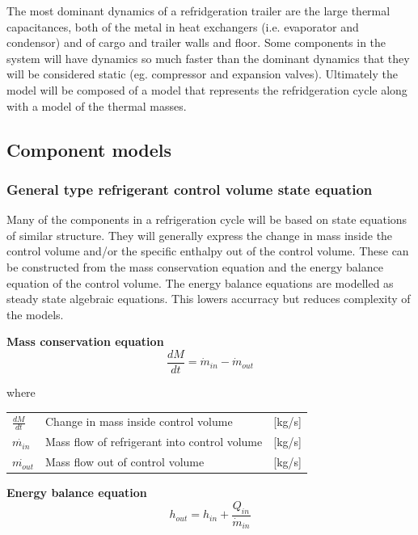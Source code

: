 The most dominant dynamics of a refridgeration trailer are the large thermal capacitances, both of the metal in heat exchangers (i.e. evaporator and condensor) and of cargo and trailer walls and floor. Some components in the system will have dynamics so much faster than the dominant dynamics that they will be considered static (eg. compressor and expansion valves).
Ultimately the model will be composed of a model that represents the refridgeration cycle along with a model of the thermal masses.


\subsection{Component models}

\subsubsection{General type refrigerant control volume state equation}
Many of the components in a refrigeration cycle will be based on state equations of similar structure. They will generally express the change in mass inside the control volume and/or the specific enthalpy out of the control volume. These can be constructed from the mass conservation equation and the energy balance equation of the control volume. The energy balance equations are modelled as steady state algebraic equations. This lowers accurracy but reduces complexity of the models.

\textbf{Mass conservation equation} \\
\begin{equation} \label{eq:GeneralTypeControlVol_MassConservation}
	\frac{dM}{dt} = \dot{m}_{in} - \dot{m}_{out}
\end{equation}

where 
\begin{center}
	\begin{tabular}{l p{8cm} l}
		$\frac{dM}{dt}$ 	& Change in mass inside control volume & [\si{kg}/\si{s}]\\ 
		$\dot{m_{in}}$ 		& Mass flow of refrigerant into control volume & [\si{kg}/\si{s}]\\
		$\dot{m_{out}}$ 	& Mass flow out of control volume & [\si{kg}/\si{s}]\\
	\end{tabular}
\end{center}

\textbf{Energy balance equation}
\begin{equation}
	h_{out} = h_{in} + \frac{Q_{in}}{\dot{m}_{in}}
\end{equation}


